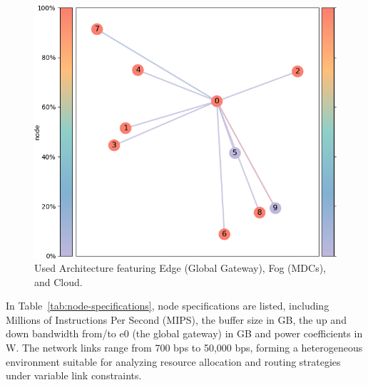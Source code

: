 \documentclass[preprint,3p,authoryear]{elsarticle}
\begin{document}
\begin{figure}[H]
    \centering
    \includegraphics[width=0.75\linewidth]{figs/used_architecture.png}
    \caption{Used Architecture featuring Edge (Global Gateway), Fog (MDCs), and Cloud.}\label{fig:used_architecture}
\end{figure}


In Table~\ref{tab:node-specifications}, node specifications are listed, including Millions of Instructions Per Second (MIPS), the buffer size in GB, the up and down bandwidth from/to e0 (the global gateway) in GB and power coefficients in W. The network links range from 700 bps to 50,000 bps, forming a heterogeneous environment suitable for analyzing resource allocation and routing strategies under variable link constraints.


\begin{table}[h!]
\centering

\caption{Detailed Specifications of Nodes}\label{tab:node-specifications}
\end{table}
\end{document}
